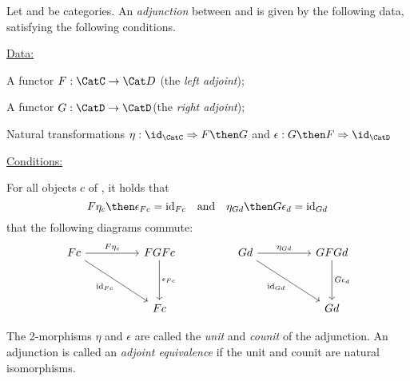 \begin{ctdefinition}[]
    \label{def:cat-adjunction}
    Let \CatC and \CatD be categories. An \emph{adjunction} between \CatC and \CatD is given by the following data, satisfying the following conditions.

    \underline{Data:}
    \begin{compactenum}
        \item A functor $F:  \CatC \rightarrow \Cat D$ (the \emph{left adjoint});
        \item A functor $G: \CatD \rightarrow \CatD$(the \emph{right adjoint});
        \item Natural transformations $\eta : \id_\CatC \Rightarrow F \then G$ and $\epsilon : G \then F \Rightarrow \id_\CatD$
    \end{compactenum}

    \underline{Conditions:}
    \begin{compactenum}
        \item For all objects $c$ of \CatC, it holds that
        \[
            F\eta_c \then \epsilon_{Fc} = \text{id}_{Fc} \quad \text{and}  \quad  \eta_{Gd} \then G\epsilon_d = \text{id}_{Gd}
        \]
         that the following diagrams commute:
        \[\begin{tikzcd}
              Fc && FGFc && Gd && GFGd \\
              \\
              && Fc &&&& Gd
              \arrow["{F\eta_c}", from=1-1, to=1-3]
              \arrow["{\epsilon_{Fc}}", from=1-3, to=3-3]
              \arrow["{\text{id}_{Fc}}"', from=1-1, to=3-3]
              \arrow["{\text{id}_{Gd}}"', from=1-5, to=3-7]
              \arrow["{\eta_{Gd}}", from=1-5, to=1-7]
              \arrow["{G\epsilon_d}", from=1-7, to=3-7]
        \end{tikzcd}\]
    \end{compactenum}
    The 2-morphisms $\eta$ and $\epsilon$ are called the \emph{unit} and \emph{counit} of the adjunction.
    An adjunction is called an \emph{adjoint equivalence} if the unit and counit are natural isomorphisms.
\end{ctdefinition}






